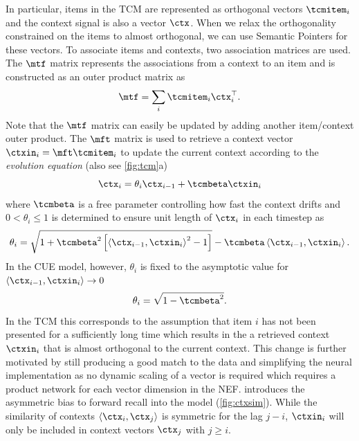 In particular, items in the TCM are represented as orthogonal vectors $\tcmitem_i$ and the context signal is also a vector $\ctx$.
When we relax the orthogonality constrained on the items to almost orthogonal, we can use Semantic Pointers for these vectors.
To associate items and contexts, two association matrices are used.
The $\mtf$ matrix represents the associations from a context to an item and is constructed as an outer product matrix as
\begin{equation}
    \mtf = \sum_i \tcmitem_i \ctx_i\Tr \text{.}
\end{equation}
Note that the $\mtf$ matrix can easily be updated by adding another item/context outer product.
The $\mft$ matrix is used to retrieve a context vector $\ctxin_i = \mft \tcmitem_i$ to update the current context according to the \emph{evolution equation} (also see \cref{fig:tcm}a)
\begin{equation}
    \ctx_i = \theta_i \ctx_{i-1} + \tcmbeta \ctxin_i\label{eqn:ctx-update}
\end{equation}
where $\tcmbeta$ is a free parameter controlling how fast the context drifts and $0 < \theta_i \leq 1$ is determined to ensure unit length of $\ctx_i$ in each timestep as
\begin{equation}
    \theta_i = \sqrt{1 + \tcmbeta^2 \sbr{\left\langle\ctx_{i-1}, \ctxin_i\right\rangle^2 - 1}} - \tcmbeta \left\langle\ctx_{i-1}, \ctxin_i\right\rangle\text{.}
\end{equation}
In the CUE model, however, $\theta_i$ is fixed to the asymptotic value for $\langle\ctx_{i-1}, \ctxin_i\rangle \rightarrow 0$
\begin{equation}
    \theta_i = \sqrt{1 - \tcmbeta^2}\text{.}
\end{equation}
In the TCM this corresponds to the assumption that item $i$ has not been presented for a sufficiently long time which results in the a retrieved context $\ctxin_i$ that is almost orthogonal to the current context.
This change is further motivated by still producing a good match to the data and simplifying the neural implementation as no dynamic scaling of a vector is required which requires a product network for each vector dimension in the NEF\@.
 introduces the asymmetric bias to forward recall into the model (\cref{fig:ctxsim}).
While the similarity of contexts $\langle\ctx_i, \ctx_j\rangle$ is symmetric for the lag $j - i$, $\ctxin_i$ will only be included in context vectors $\ctx_j$ with $j \geq i$.
